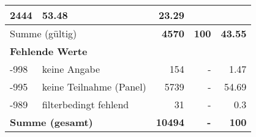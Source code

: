 \begin{longtable}{lXrrr}
       \num{2444} &
       \num[round-mode=places,round-precision=2]{53.48} &
         \num[round-mode=places,round-precision=2]{23.29} \\
     \midrule
     \multicolumn{2}{l}{Summe (gültig)} &
       \textbf{\num{4570}} &
     \textbf{\num{100}} &
       \textbf{\num[round-mode=places,round-precision=2]{43.55}} \\
     \multicolumn{5}{l}{\textbf{Fehlende Werte}}\\
       -998 &
       keine Angabe &
         \num{154} &
        - &
         \num[round-mode=places,round-precision=2]{1.47} \\
       -995 &
       keine Teilnahme (Panel) &
         \num{5739} &
        - &
         \num[round-mode=places,round-precision=2]{54.69} \\
       -989 &
       filterbedingt fehlend &
         \num{31} &
        - &
         \num[round-mode=places,round-precision=2]{0.3} \\
     \midrule
     \multicolumn{2}{l}{\textbf{Summe (gesamt)}} &
          \textbf{\num{10494}} &
        \textbf{-} &
        \textbf{\num{100}} \\
     \bottomrule
     \end{longtable}
     
